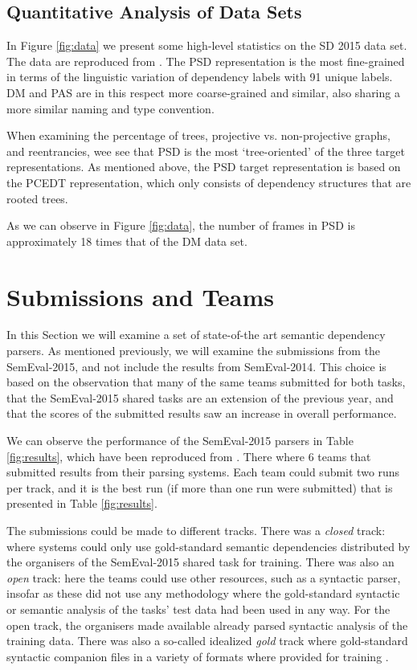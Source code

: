 \subsection{Quantitative Analysis of Data Sets}
\label{sec:quantitative}

In Figure \ref{fig:data} we present some high-level statistics on the SD 2015 data set. The data are reproduced from . The PSD representation is the most fine-grained in terms of the linguistic variation of dependency labels with 91 unique labels. DM and PAS are in this respect more coarse-grained and similar, also sharing a more similar naming and type convention.

When examining the percentage of trees, projective vs. non-projective graphs, and reentrancies, wee see that PSD is the most `tree-oriented' of the three target representations. As mentioned above, the PSD target representation is based on the PCEDT representation, which only consists of dependency structures that are rooted trees. 

As we can observe in Figure \ref{fig:data}, the number of frames in PSD is approximately 18 times that of the DM data set. 

\section{Submissions and Teams}
\label{sec:parsers}

In this Section we will examine a set of state-of-the art semantic dependency parsers. As mentioned previously, we will examine the submissions from the SemEval-2015, and not include the results from SemEval-2014. This choice is based on the observation that many of the same teams submitted for both tasks, that the SemEval-2015 shared tasks are an extension of the previous year, and that the scores of the submitted results saw an increase in overall performance.

We can observe the performance of the SemEval-2015 parsers in Table \ref{fig:results}, which have been reproduced from . There where 6 teams that submitted results from their parsing systems. Each team could submit two runs per track, and it is the best run (if more than one run were submitted) that is presented in Table \ref{fig:results}. 

The submissions could be made to different tracks. There was a \textit{closed} track: where systems could only use gold-standard semantic dependencies distributed by the organisers of the SemEval-2015 shared task for training. There was also an \textit{open} track: here the teams could use other resources, such as a syntactic parser, insofar as these did not use any methodology where the gold-standard syntactic or semantic analysis of the tasks' test data had been used in any way. For the open track, the organisers made available already parsed syntactic analysis of the training data. There was also a so-called idealized \textit{gold} track where gold-standard syntactic companion files in a variety of formats where provided for training \cite{Oepen:15}.

